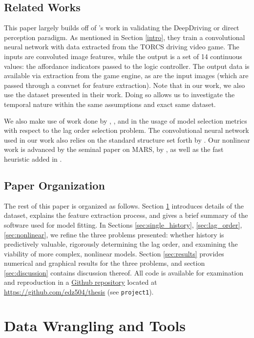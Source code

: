 \documentclass[11pt]{article}
\begin{document}
\subsection{Related Works}
This paper largely builds off of \cite{deepdriving}'s work in validating the DeepDriving or direct perception paradigm.  As mentioned in Section \ref{intro}, they train a convolutional neural network with data extracted from the TORCS driving video game.  The inputs are convoluted image features, while the output is a set of 14 continuous values: the affordance indicators passed to the logic controller.  The output data is available via extraction from the game engine, as are the input images (which are passed through a convnet for feature extraction).  Note that in our work, we also use the dataset presented in their work.  Doing so allows us to investigate the temporal nature within the same assumptions and exact same dataset.\par
We also make use of work done by \cite{aic_bic1}, \cite{aic_bic2}, and \cite{liew} in the usage of model selection metrics with respect to the lag order selection problem.  The convolutional neural network used in our work also relies on the standard structure set forth by \cite{lenet}.  Our nonlinear work is advanced by the seminal paper on MARS, by \cite{mars}, as well as the fast heuristic added in \cite{fastmars}.
\subsection{Paper Organization}
The rest of this paper is organized as follows. Section \ref{sec:data_tools} introduces details of the dataset, explains the feature extraction process, and gives a brief summary of the software used for model fitting.  In Sections \ref{sec:single_history}, \ref{sec:lag_order}, \ref{sec:nonlinear}, we refine the three problems presented: whether history is predictively valuable, rigorously determining the lag order, and examining the viability of more complex, nonlinear models.  Section \ref{sec:results} provides numerical and graphical results for the three problems, and section \ref{sec:discussion} contains discussion thereof.  All code is available for examination and reproduction in a \href{https://github.com/edz504/thesis}{Github repository} located at \url{https://github.com/edz504/thesis} (see \lstinline{project1}).
\newpage
\section{Data Wrangling and Tools}\label{sec:data_tools}
\end{document}
